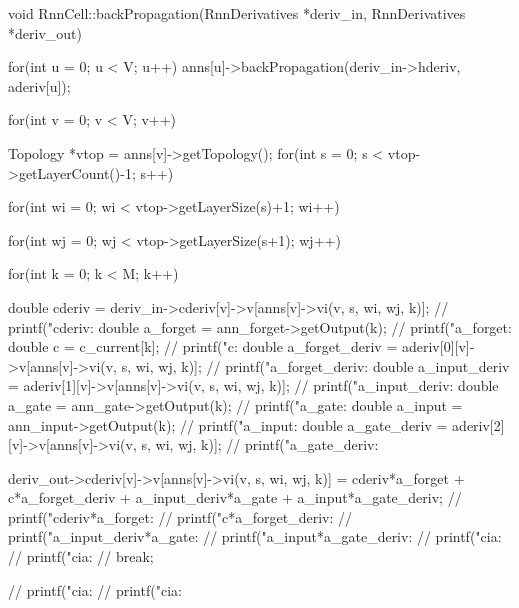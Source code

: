 void RnnCell::backPropagation(RnnDerivatives *deriv\_in, RnnDerivatives *deriv\_out){



  for(int u = 0; u < V; u++)
    anns[u]->backPropagation(deriv\_in->hderiv, aderiv[u]);



  for(int v = 0; v < V; v++){

    Topology *vtop = anns[v]->getTopology();
    for(int s = 0; s < vtop->getLayerCount()-1; s++){

      for(int wi = 0; wi < vtop->getLayerSize(s)+1; wi++){

        for(int wj = 0; wj < vtop->getLayerSize(s+1); wj++){


          for(int k = 0; k < M; k++){

            double cderiv = deriv\_in->cderiv[v]->v[anns[v]->vi(v, s, wi, wj, k)];
            // printf("cderiv: %
            double a\_forget = ann\_forget->getOutput(k);
            // printf("a\_forget: %
            double c = c\_current[k];
            // printf("c: %
            double a\_forget\_deriv = aderiv[0][v]->v[anns[v]->vi(v, s, wi, wj, k)];
            // printf("a\_forget\_deriv: %
            double a\_input\_deriv = aderiv[1][v]->v[anns[v]->vi(v, s, wi, wj, k)];
            // printf("a\_input\_deriv: %
            double a\_gate = ann\_gate->getOutput(k);
            // printf("a\_gate: %
            double a\_input = ann\_input->getOutput(k);
            // printf("a\_input: %
            double a\_gate\_deriv = aderiv[2][v]->v[anns[v]->vi(v, s, wi, wj, k)];
            // printf("a\_gate\_deriv: %

            deriv\_out->cderiv[v]->v[anns[v]->vi(v, s, wi, wj, k)] = cderiv*a\_forget + c*a\_forget\_deriv + a\_input\_deriv*a\_gate + a\_input*a\_gate\_deriv;
            // printf("cderiv*a\_forget:  %
            // printf("c*a\_forget\_deriv:  %
            // printf("a\_input\_deriv*a\_gate:  %
            // printf("a\_input*a\_gate\_deriv:  %
            // printf("cia:  %
            // printf("cia:  %
            // break;
          }
        }
      }
    }
    // printf("cia:  %
    // printf("cia:  %


}}
